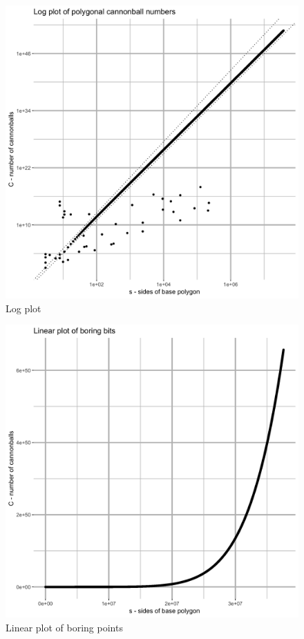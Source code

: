 \begin{figure}[H]
\centering
\includegraphics[width=\textwidth]{../graph/all_log.png}
\caption{Log plot}
\label{fig_log_all}
\end{figure}

\begin{figure}[H]
\centering
\includegraphics[width=\textwidth]{../graph/boring_lin.png}
\caption{Linear plot of boring points}
\label{fig_linear_boring}
\end{figure}

